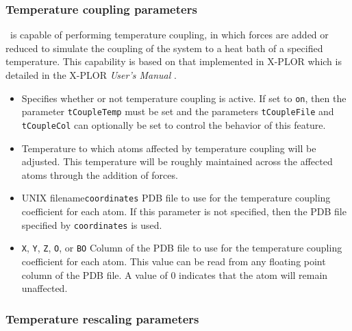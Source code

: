 \subsubsection{Temperature coupling parameters}

\PDAC\ is capable
of performing temperature coupling, in which forces are added or 
reduced to simulate the coupling of the system to a heat bath 
of a specified temperature.  
This capability is based on that implemented in X-PLOR which is detailed
in the X-PLOR {\it User's Manual} .

\begin{itemize}

\item
{}
{Specifies whether or not temperature coupling is active.  
If set to {\tt on}, then the parameter {\tt tCoupleTemp} must be set and 
the parameters {\tt tCoupleFile} and {\tt tCoupleCol} can 
optionally be set to control the behavior of this feature.} 

\item
{}
{Temperature to which atoms affected 
by temperature coupling will be adjusted.  
This temperature will be roughly maintained across the affected atoms 
through the addition of forces.}

\item
{}
{UNIX filename}{{\tt coordinates}}
{PDB file to use for the temperature coupling coefficient for each atom.  
If this parameter is not specified, then 
the PDB file specified by {\tt coordinates} is used.} 

\item
{}
{{\tt X}, {\tt Y}, {\tt Z}, {\tt O}, or {\tt B}}{{\tt O}} 
{Column of the PDB file to use for the temperature coupling coefficient for 
each atom.  This value can be read from any 
floating point column of the PDB file.  
A value of $0$ indicates that the atom will remain unaffected.}

\end{itemize}

\subsubsection{Temperature rescaling parameters}

